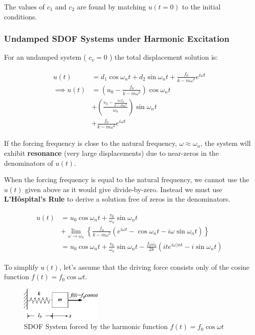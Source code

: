 \documentclass[10pt,b5paper,titlepage]{book}
\newenvironment{eqarray}
{
    \begin{eqnarray}
        \begin{aligned}
}
{
        \end{aligned}
    \end{eqnarray}
}
\begin{document}
The values of $ c_1 $ and $ c_2 $ are found by matching $ u(t=0) $ to the
initial conditions.

\subsubsection{Undamped SDOF Systems under Harmonic Excitation}

For an undamped system ( $ c_v = 0 $ ) the total displacement solution is:

\begin{eqarray}
    u(t) &= d_1 \cos{\omega_n t} + d_2 \sin{\omega_n t} +
    \frac{f_0}{k - m \omega^2} e^{i \omega t}\\
    \implies u(t) &= \left( u_0 - \frac{f_0}{k - m \omega^2} \right) \cos{\omega_n t}\\
                  &+
    \left(\frac{v_0 - \frac{i \omega f_0}{k - m \omega^2}}{\omega_n} \right)
    \sin{\omega_n t}\\
                  &+ \frac{f_0}{k - m \omega^2} e^{i \omega t}
\end{eqarray}

If the forcing frequency is close to the natural frequency, $ \omega \approx \omega_n $,
the system will exhibit \textbf{resonance} (very large displacements) due to
near-zeros in the denominators of $ u(t) $.

When the forcing frequency is equal to the natural frequency, we cannot use the
$ u(t) $ given above as it would give divide-by-zero. Instead we must use
\textbf{L'H\^ospital's Rule} to derive a solution free of zeros in the denominators.

\begin{eqarray}
    u(t) &= u_0 \cos{\omega_n t} + \frac{v_0}{\omega_n} \sin{\omega_n t}\\
         &+ \lim_{\omega \rightarrow \omega_n} \left\{
             \frac{f_0}{k - m \omega^2} \left(
                 e^{i \omega t} - \cos{\omega_n t} - i \omega \sin{\omega_n t}
                 \right)
         \right\}\\
         &= u_0 \cos{\omega_n t} + \frac{v_0}{\omega_n} \sin{\omega_n t}
         - \frac{f_0 \omega_n}{2 k} \left(
             i t e^{i \omega)n t} - i \sin{\omega_n t}
             \right)
\end{eqarray}

To simplify $ u(t) $, let's assume that the driving force consists only of the
cosine function $ f(t) = f_0 \cos{\omega t} $.

\begin{figure}[ht]
    \centering
    \includegraphics[width=0.35\textwidth]{img/SDOF_harmonic_undamped.png}
    \caption{SDOF System forced by the harmonic function $ f(t) = f_0 \cos{\omega t} $}
    \label{fig:SDOF-harmonic-undamped-response-png}
\end{figure}
\end{document}
